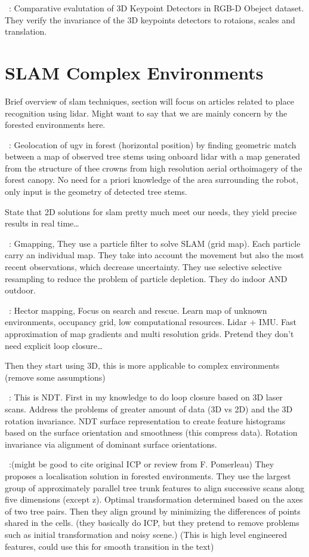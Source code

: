 ~\cite{Filipe2014}:
Comparative evalutation of 3D Keypoint Detectors in RGB-D Obeject dataset. They verify the invariance of the 3D keypoints detectors to rotaions, scales and translation.


\section{SLAM Complex Environments}
Brief overview of slam techniques, section will focus on articles related to place recognition using lidar. Might want to say that we are mainly concern by the forested environments here. 

~\cite{Hussein2015}:
Geolocation of ugv in forest (horizontal position) by finding geometric match between a map of observed tree stems using onboard lidar with a map generated from the structure of thee crowns from high resolution aerial orthoimagery of the forest canopy. No need for a priori knowledge of the area surrounding the robot, only input is the geometry of detected tree stems.

State that 2D solutions for slam pretty much meet our needs, they yield precise results in real time\dots

~\cite{Grisetti2007}: Gmapping,
They use a particle filter to solve SLAM (grid map). Each particle carry an individual map. They take into account the movement but also the most recent observations, which decrease uncertainty. They use selective selective resampling to reduce the problem of particle depletion. They do indoor AND outdoor. 

~\cite{Kohlbrecher2011}: Hector mapping,
Focus on search and rescue. Learn map of unknown environments, occupancy grid, low computational resources. Lidar + IMU. Fast approximation of map gradients and multi resolution grids. Pretend they don't need explicit loop closure\dots


Then they start using 3D, this is more applicable to complex environments (remove some assumptions)

~\cite{Magnusson2009}:
This is NDT. First in my knowledge to do loop closure based on 3D laser scans. Address the problems of greater amount of data (3D vs 2D) and the 3D rotation invariance. NDT surface representation to create feature histograms based on the surface orientation and smoothness (this compress data). Rotation invariance via alignment of dominant surface orientations.

~\cite{Song2012}:(might be good to cite original ICP or review from F. Pomerleau)
They proposes a localisation solution in forested environments. They use the largest group of approximately parallel tree trunk features to align successive scans along five dimensions (except z). Optimal transformation determined based on the axes of two tree pairs. Then they align ground by minimizing the differences of points shared in the cells. (they basically do ICP, but they pretend to remove problems such as initial transformation and noisy scene.) (This is high level engineered features, could use this for smooth transition in the text)

